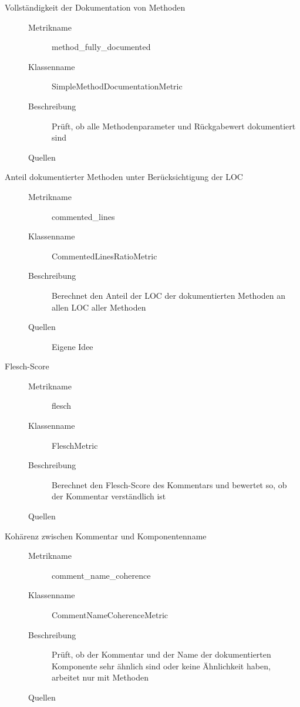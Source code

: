 \begin{appendices}
\begin{description}
\item[Vollständigkeit der Dokumentation von Methoden]
\begin{description}
\item[]
    \item [Metrikname]  method\_fully\_documented
    \item [Klassenname] SimpleMethodDocumentationMetric
    \item[Beschreibung] Prüft, ob alle Methodenparameter und Rückgabewert dokumentiert sind
    \item[Quellen] \cite[S. 5]{HowDocumentationEvolvesoverTime}
\end{description}

\item[Anteil dokumentierter Methoden unter
Berücksichtigung der LOC]
\begin{description}
\item[]
    \item [Metrikname]  commented\_lines
    \item [Klassenname] CommentedLinesRatioMetric
    \item[Beschreibung]  Berechnet den Anteil der \ac{LOC} der dokumentierten Methoden an allen \ac{LOC} aller Methoden
    \item[Quellen] Eigene Idee
\end{description}

\item[Flesch-Score]
\begin{description}
\item[]
    \item [Metrikname]  flesch
    \item [Klassenname] FleschMetric
    \item[Beschreibung]   Berechnet den Flesch-Score des Kommentars und bewertet so, ob der Kommentar verständlich ist
    \item[Quellen] \cite[S. 72]{AutomaticQualityAssessmentofSourceCodeComments:TheJavadocMiner}
\end{description}

\item[Kohärenz zwischen Kommentar und
Komponentenname]
\begin{description}
\item[]
    \item [Metrikname]  comment\_name\_coherence
    \item [Klassenname] CommentNameCoherenceMetric
    \item[Beschreibung]  Prüft, ob der Kommentar und der Name der dokumentierten Komponente sehr ähnlich sind oder keine Ähnlichkeit haben, arbeitet nur mit Methoden
    \item[Quellen] \cite[S. 86ff ]{Qualityanalysisofsourcecodecomments}
\end{description}


\end{description}
\end{appendices}
